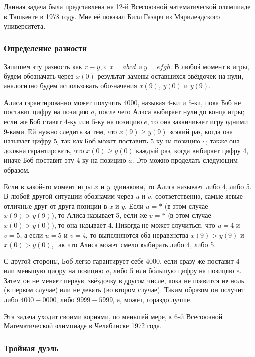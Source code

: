 Данная задача была представлена на 12-й Всесоюзной математической олимпиаде в Ташкенте в 1978 году.
Мне её показал Билл Газарч из Мэрилендского университета.%

\subsubsection*{Определение разности}%

Запишем эту разность как $x-y$, с $x=abcd$ и $y=efgh$.
В любой момент в игры, будем обозначать через $x(0)$ результат замены оставшихся звёздочек на нули, аналогично будем использовать обозначения $x(9)$, $y(0)$ и $y(9)$.

Алиса гарантированно может получить 4000, называя $4$-ки и $5$-ки, пока Боб не поставит цифру на позицию $a$, после чего Алиса выбирает нули до конца игры;
если же Боб ставит $4$-ку или $5$-ку на позицию $e$, то она заканчивает игру одними $9$-ками.
Ей нужно следить за тем, что $x(9)\ge y(9)$ всякий раз, когда она называет цифру 5, так как Боб может поставить $5$-ку на позицию $e$;
также она должна гарантировать, что $x(0)\ge y(0)$ каждый раз, когда выбирает цифру 4, иначе Боб поставит эту $4$-ку на позицию $a$.
Это можно проделать следующим образом.

Если в какой-то момент игры $x$ и $y$ одинаковы, то Алиса называет либо 4, либо 5.
В любой другой ситуации обозначим через $u$ и $v$, соответственно, самые левые отличные друг от друга позиции в $x$ и $y$.
Если $u=*$ (в этом случае $x(9)> y(9)$), то Алиса называет 5, если же $v=*$ (в этом случае $x(0)> y(0)$), то она называет 4.
Никогда не может случиться, что $u=4$ и $v=5$, а если $u=5$ и $v=4$, то выполняются оба неравенства $x(9)> y(9)$ и $x(0)> y(0)$, так что Алиса может смело выбирать либо 4, либо 5.

С другой стороны, Боб легко гарантирует себе 4000, если сразу же поставит 4 или меньшую цифру на позицию $a$, либо 5 или б\'{о}льшую цифру на позицию $e$.
Затем он не меняет первую звёздочку в другом числе, пока не появится не ноль (в первом случае) или не девять (во втором случае).
Таким образом он получит либо $4000-0000$, либо $9999-5999$, а, может, гораздо лучше.
\heart

Эта задача уходит своими корнями, по меньшей мере, к 6-й Всесоюзной Математической олимпиаде в Челябинске 1972 года.

\subsubsection*{Тройная дуэль}%


